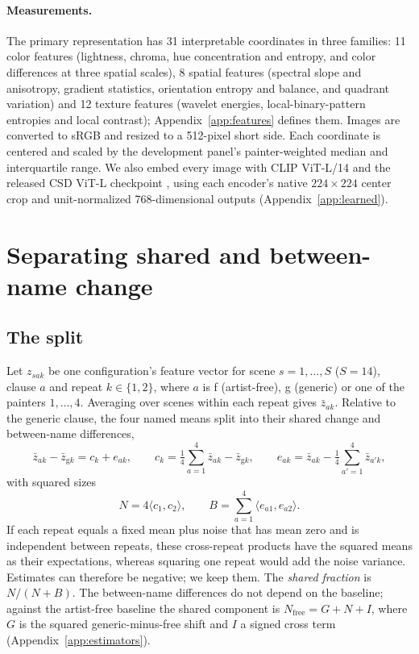 \documentclass[10pt]{article}
\newcommand{\ip}[2]{\langle #1,#2\rangle}
\begin{document}
\paragraph{Measurements.}
The primary representation has 31 interpretable coordinates in three families: 11 color
features (lightness, chroma, hue concentration and entropy, and color differences at three
spatial scales), 8 spatial features (spectral slope and anisotropy, gradient statistics,
orientation entropy and balance, and quadrant variation) and 12 texture features (wavelet
energies, local-binary-pattern entropies and local contrast); Appendix~\ref{app:features}
defines them. Images are converted to sRGB and resized to a 512-pixel short side. Each
coordinate is centered and scaled by the development panel's painter-weighted median and
interquartile range. We also embed every image with CLIP ViT-L/14 \citep{radford2021} and
the released CSD ViT-L checkpoint \citep{somepalli2024style}, using each encoder's native
$224\times224$ center crop and unit-normalized 768-dimensional outputs
(Appendix~\ref{app:learned}).

\section{Separating shared and between-name change}\label{sec:method}

\subsection{The split}

Let $z_{sak}$ be one configuration's feature vector for scene $s=1,\dots,S$ ($S=14$), clause
$a$ and repeat $k\in\{1,2\}$, where $a$ is f (artist-free), g (generic) or one of the painters
$1,\dots,4$. Averaging over scenes within each repeat gives $\bar z_{ak}$. Relative to the
generic clause, the four named means split into their shared change and between-name
differences,
\begin{equation}
\bar z_{ak}-\bar z_{\mathrm{g}k}=c_k+e_{ak},\qquad
c_k=\tfrac14\sum_{a=1}^4\bar z_{ak}-\bar z_{\mathrm{g}k},\qquad
e_{ak}=\bar z_{ak}-\tfrac14\sum_{a'=1}^4\bar z_{a'k},
\label{eq:split}
\end{equation}
with squared sizes
\begin{equation}
N=4\ip{c_1}{c_2},\qquad B=\sum_{a=1}^4\ip{e_{a1}}{e_{a2}}.
\label{eq:components}
\end{equation}
If each repeat equals a fixed mean plus noise that has mean zero and is independent between
repeats, these cross-repeat products have the squared means as their expectations, whereas
squaring one repeat would add the noise variance. Estimates can therefore be negative; we
keep them. The \emph{shared fraction} is $N/(N+B)$. The between-name differences do not
depend on the baseline; against the artist-free baseline the shared component is
$N_{\mathrm{free}}=G+N+I$, where $G$ is the squared generic-minus-free shift and $I$ a
signed cross term (Appendix~\ref{app:estimators}).
\end{document}
